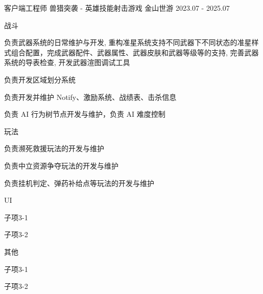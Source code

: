 

\begin{cventries}

\cventry
    {客户端工程师} %
    {兽猎突袭 -  英雄技能射击游戏} %
    {金山世游} %
    {2023.07 - 2025.07} %
    {
        \begin{cvitems}
            \item {战斗
                \begin{cvsubitems}
                    \item {负责武器系统的日常维护与开发, 重构准星系统支持不同武器下不同状态的准星样式组合配置，完成武器配件、武器属性、武器皮肤和武器等级等的支持, 完善武器系统的导表检查, 开发武器渲图调试工具}
                    \item {负责开发区域划分系统}
                    \item {负责开发并维护 Notify、激励系统、战绩表、击杀信息}
                    \item {负责 AI 行为树节点开发与维护，负责 AI 难度控制}
                \end{cvsubitems}
            }
            \item {玩法
                \begin{cvsubitems}
                    \item {负责濒死救援玩法的开发与维护}
                    \item {负责中立资源争夺玩法的开发与维护}
                    \item {负责挂机判定、弹药补给点等玩法的开发与维护}
                \end{cvsubitems}
            }
            \item {UI
                \begin{cvsubitems}
                    \item {子项3-1}
                    \item {子项3-2}
                \end{cvsubitems}
            }
            \item {其他
                \begin{cvsubitems}
                    \item {子项3-1}
                    \item {子项3-2}
                \end{cvsubitems}
            }
        \end{cvitems}
    }


\end{cventries}
